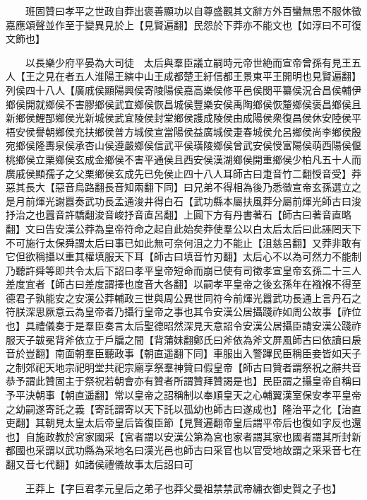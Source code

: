　　班固贊曰孝平之世政自莽出褒善顯功以自尊盛觀其文辭方外百蠻無思不服休徵嘉應頌聲並作至于變異見於上【見賢遍翻】民怨於下莽亦不能文也【如淳曰不可復文飾也】

　　以長樂少府平晏為大司徒　太后與羣臣議立嗣時元帝世絶而宣帝曾孫有見王五人【王之見在者五人淮陽王縯中山王成都楚王紆信都王景東平王開明也見賢遍翻】列侯四十八人【廣戚侯顯陽興侯寄陵陽侯嘉高樂侯修平邑侯閔平纂侯況合昌侯輔伊鄉侯開就鄉侯不害膠鄉侯武宜鄉侯恢昌城侯豐樂安侯禹陶鄉侯恢釐鄉侯褒昌鄉侯且新鄉侯鯉郚鄉侯光新城侯武宜陵侯封堂鄉侯護成陵侯由成陽侯衆復昌侯休安陸侯平梧安侯譽朝鄉侯充扶鄉侯普方城侯宣當陽侯益廣城侯疌春城侯允呂鄉侯尚李鄉侯殷宛鄉侯隆夀泉侯承杏山侯遵嚴鄉侯信武平侯璜陵鄉侯曾武安侯㥅富陽侯萌西陽侯偃桃鄉侯立栗鄉侯玄成金鄉侯不害平通侯且西安侯漢湖鄉侯開重鄉侯少柏凡五十人而廣戚侯顯孺子之父栗鄉侯玄成先已免侯止四十八人耳師古曰疌音竹二翻㥅音受】莽惡其長大【惡音烏路翻長音知兩翻下同】曰兄弟不得相為後乃悉徵宣帝玄孫選立之是月前煇光謝囂奏武功長孟通浚井得白石【武功縣本屬扶風莽分屬前煇光師古曰浚抒治之也囂音許驕翻浚音峻抒音直呂翻】上圓下方有丹書著石【師古曰著音直略翻】文曰告安漢公莽為皇帝符命之起自此始矣莽使羣公以白太后太后曰此誣罔天下不可施行太保舜謂太后曰事已如此無可奈何沮之力不能止【沮慈呂翻】又莽非敢有它但欲稱攝以重其權填服天下耳【師古曰填音竹刃翻】太后心不以為可然力不能制乃聽許舜等即共令太后下詔曰孝平皇帝短命而崩已使有司徵孝宣皇帝玄孫二十三人差度宜者【師古曰差度謂擇也度音大各翻】以嗣孝平皇帝之後玄孫年在襁褓不得至德君子孰能安之安漢公莽輔政三世與周公異世同符今前煇光囂武功長通上言丹石之符朕深思厥意云為皇帝者乃攝行皇帝之事也其令安漢公居攝踐祚如周公故事【祚位也】具禮儀奏于是羣臣奏言太后聖德昭然深見天意詔令安漢公居攝臣請安漢公踐祚服天子韍冕背斧依立于戶牖之間【背蒲妹翻鄭氏曰斧依為斧文屏風師古曰依讀曰扆音於豈翻】南面朝羣臣聽政事【朝直遥翻下同】車服出入警蹕民臣稱臣妾皆如天子之制郊祀天地宗祀明堂共祀宗廟享祭羣神贊曰假皇帝【師古曰贊者謂祭祝之辭共音恭予謂此贊固主于祭祝若朝會亦有贊者所謂贊拜贊謁是也】民臣謂之攝皇帝自稱曰予平決朝事【朝直遥翻】常以皇帝之詔稱制以奉順皇天之心輔翼漢室保安孝平皇帝之幼嗣遂寄託之義【寄託謂寄以天下託以孤幼也師古曰遂成也】隆治平之化【治直吏翻】其朝見太皇太后帝皇后皆復臣節【見賢遍翻帝皇后謂平帝后也復如字反也還也】自施政教於宮家國采【宮者謂以安漢公第為宮也家者謂其家也國者謂其所封新都國也采謂以武功縣為采地名曰漢光邑也師古曰采官也以官受地故謂之采采音七在翻又音七代翻】如諸侯禮儀故事太后詔曰可

　　王莽上【字巨君孝元皇后之弟子也莽父曼祖禁禁武帝繡衣御史賀之子也】

